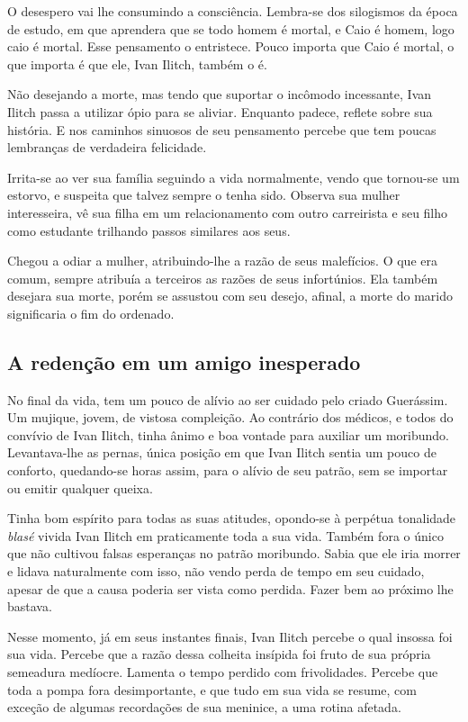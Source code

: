 \documentclass[12pt]{extarticle}
\begin{document}
O desespero vai lhe consumindo a consciência. Lembra-se dos silogismos
da época de estudo, em que aprendera que se todo homem é mortal, e Caio
é homem, logo caio é mortal. Esse pensamento o entristece. Pouco importa
que Caio é mortal, o que importa é que ele, Ivan Ilitch, também o é.

Não desejando a morte, mas tendo que suportar o incômodo incessante,
Ivan Ilitch passa a utilizar ópio para se aliviar. Enquanto padece,
reflete sobre sua história. E nos caminhos sinuosos de seu pensamento
percebe que tem poucas lembranças de verdadeira felicidade.

Irrita-se ao ver sua família seguindo a vida normalmente, vendo que
tornou-se um estorvo, e suspeita que talvez sempre o tenha sido. Observa
sua mulher interesseira, vê sua filha em um relacionamento com outro
carreirista e seu filho como estudante trilhando passos similares aos
seus.

Chegou a odiar a mulher, atribuindo-lhe a razão de seus malefícios. O
que era comum, sempre atribuía a terceiros as razões de seus
infortúnios. Ela também desejara sua morte, porém se assustou com seu
desejo, afinal, a morte do marido significaria o fim do ordenado.

\subsection{A redenção em um amigo inesperado}

No final da vida, tem um pouco de alívio ao ser cuidado pelo criado
Guerássim. Um mujique, jovem, de vistosa compleição. Ao contrário dos
médicos, e todos do convívio de Ivan Ilitch, tinha ânimo e boa vontade
para auxiliar um moribundo. Levantava-lhe as pernas, única posição em
que Ivan Ilitch sentia um pouco de conforto, quedando-se horas assim,
para o alívio de seu patrão, sem se importar ou emitir qualquer queixa.

Tinha bom espírito para todas as suas atitudes, opondo-se à perpétua
tonalidade \emph{blasé} vivida Ivan Ilitch em praticamente toda a sua
vida. Também fora o único que não cultivou falsas esperanças no patrão
moribundo. Sabia que ele iria morrer e lidava naturalmente com isso, não
vendo perda de tempo em seu cuidado, apesar de que a causa poderia ser
vista como perdida. Fazer bem ao próximo lhe bastava.

Nesse momento, já em seus instantes finais, Ivan Ilitch percebe o qual
insossa foi sua vida. Percebe que a razão dessa colheita insípida foi
fruto de sua própria semeadura medíocre. Lamenta o tempo perdido com
frivolidades. Percebe que toda a pompa fora desimportante, e que tudo em
sua vida se resume, com exceção de algumas recordações de sua meninice,
a uma rotina afetada.
\end{document}
